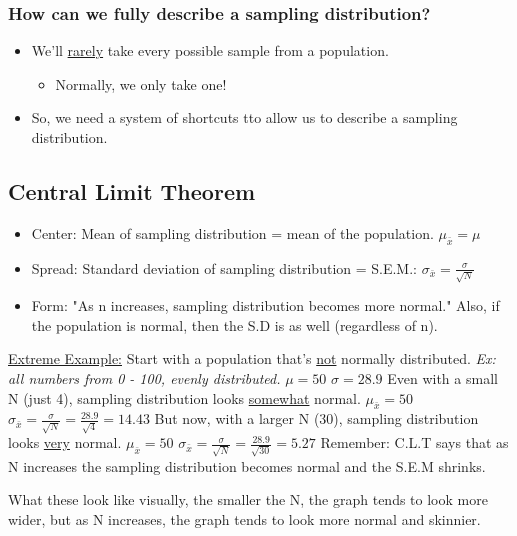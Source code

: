 \documentclass[11pt]{report}
\begin{document}
\subsubsection{How can we fully describe a sampling distribution?} 
\begin{itemize}
    \item We'll \underline{rarely} take every possible sample from a population. 
    \begin{itemize}
        \item Normally, we only take one!
    \end{itemize}
    \item So, we need a system of shortcuts tto allow us to describe a sampling distribution. 
\end{itemize}

\subsection{Central Limit Theorem}
\begin{itemize}
    \item Center: Mean of sampling distribution = mean of the population. $\mu_{\bar{x}} = \mu$
    \item Spread: Standard deviation of sampling distribution = S.E.M.: $\sigma_{\bar{x}} = \frac{\sigma}{\sqrt{N}}$
    \item Form: "As n increases, sampling distribution becomes more normal." Also, if the population is normal, then the S.D is as well (regardless of n).
\end{itemize}

{
    \underline{Extreme Example:} Start with a population that's \underline{not} normally distributed. \textit{Ex: all numbers from 0 - 100, evenly distributed.} \newline 
    $\mu = 50$ \newline
    $\sigma = 28.9$ \newline
    Even with a small N (just 4), sampling distribution looks \underline{somewhat} normal. \newline
    $\mu_{\bar{x}} = 50$ \newline
    $\sigma_{\bar{x}} = \frac{\sigma}{\sqrt{N}} = \frac{28.9}{\sqrt{4}} = 14.43$ \newline
    But now, with a larger N (30), sampling distribution looks \underline{very} normal. \newline
    $\mu_{\bar{x}} = 50$ \newline
    $\sigma_{\bar{x}} = \frac{\sigma}{\sqrt{N}} = \frac{28.9}{\sqrt{30}} = 5.27$ \newline
    Remember: C.L.T says that as N increases the sampling distribution becomes normal and the S.E.M shrinks. \newline\newline

    What these look like visually, the smaller the N, the graph tends to look more wider, but as N increases, the graph tends to look more normal and skinnier.
}
\end{document}
